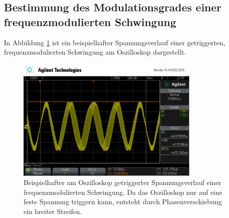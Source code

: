 \newpage

\subsection{Bestimmung des Modulationsgrades einer frequenzmodulierten Schwingung}
\label{sec:bestmod}

In Abbildung \ref{fig:bestmod} ist ein beispielhafter Spannungsverlauf einer getriggerten, frequenzmodulierten Schwingung
am Oszilloskop dargestellt.

\begin{figure}
  \centering
  \includegraphics[height=6cm]{Oszi_Pics/freqModRing.png}
  \caption{Beispielhafter am Oszilloskop getriggerter Spannungsverlauf einer frequenzmodulierten Schwingung. Da das Oszilloskop
  nur auf eine feste Spannung triggern kann, entsteht durch Phasenverschiebung ein breiter Streifen.}
  \label{fig:bestmod}
\end{figure}


